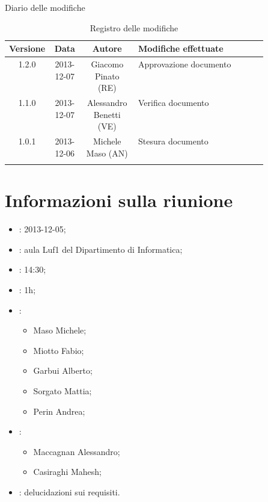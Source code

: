 
\newpage
Diario delle modifiche
\begin{center}
\begin{longtable}{|c|c|c|p{0.5\linewidth}|}
\toprule
\textbf{Versione} & \textbf{Data} & \textbf{Autore} & \textbf{Modifiche effettuate}\\


\midrule
1.2.0 & 2013-12-07 & Giacomo Pinato (RE) & Approvazione documento\\
\midrule
1.1.0 & 2013-12-07 & Alessandro Benetti (VE) & Verifica documento\\
\midrule
1.0.1 & 2013-12-06 & Michele Maso (AN) & Stesura documento\\

\bottomrule
\caption{Registro delle modifiche}
\label{tab:changelog}
\end{longtable}
\end{center}

\newpage
\tableofcontents


\newpage
\section{Informazioni sulla riunione}%
\label{1.0}
\begin{itemize}
\item {}: 2013-12-05;
\item {}: aula Luf1 del Dipartimento di Informatica;
\item {}: 14:30;
\item {}: 1h;
\item {}: \NomeGruppo{}
\begin{itemize}
\item Maso Michele;
\item Miotto Fabio;
\item Garbui Alberto;
\item Sorgato Mattia;
\item Perin Andrea;
\end{itemize}
\item {}: \Prop{}
\begin{itemize}
\item Maccagnan Alessandro;
\item Casiraghi Mahesh;
\end{itemize}
\item {}: delucidazioni sui requisiti.
\end{itemize}

